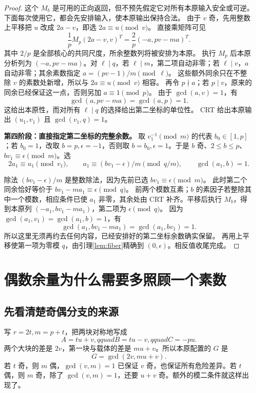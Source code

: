 \documentclass[11pt,a4paper,oneside,openany]{book}
\theoremstyle{definition}
\numberwithin{equation}{chapter}
\begin{document}
\begin{proof}
这个 $M_b$ 是可用的正向返回，但不预先假定它对所有本原输入安全或可逆。
下面每次使用它，都会先安排输入，使本原输出保持合法。
由于 $v$ 奇，先用整数上平移把 $u$ 改成 $2a-v$，即选 $2a\equiv u\pmod v$。
直接乘矩阵可见
\[
\frac1pM_p(2a-v,v)^T=\frac2p(-a,pv-ma)^T.
\]
其中 $2/p$ 是全部核心的共同尺度，所余整数列将被安排为本原。
执行 $M_p$ 后本原分析列为 $(-a,pv-ma)$。对 $\ell\mid q$，若 $\ell\mid m$，第二项自动非零；若 $\ell\mid v$，$a$ 自动非零；其余素数指定 $a=(pv-1)/m\pmod\ell$。
这些额外同余只在不整除 $v$ 的素数处新增，所以与 $2a\equiv u\pmod v$ 相容。
再令 $p\nmid a$；若 $p\mid v$，原来的同余已经保证这一点，否则另加 $a\equiv1\pmod p$。
由于 $\gcd(a,v)=1$，有
\[
\gcd(a,pv-ma)=\gcd(a,p)=1.
\]
这给出本原性，而对所有 $\ell\mid q$ 的选择给出第二坐标的单位性。
CRT 给出本原输出 $(u_1,v_1)$ 且 $\gcd(v_1,q)=1$。

\par\noindent\textbf{第四阶段：直接指定第二坐标的完整余数。}
取 $v_1^{-1}\pmod m$ 的代表 $b_0\in[1,p]$；若 $b_0=1$，改取 $b=p,\epsilon=-1$，否则取 $b=b_0,\epsilon=1$。于是 $b$ 奇、$2\le b\le p$、$bv_1\equiv\epsilon\pmod m$。选
\[
2a_1\equiv u_1\pmod{v_1},\qquad
a_1\equiv(bv_1-\epsilon)/m\pmod{q/m},\qquad \gcd(a_1,b)=1.
\]

除法 $(bv_1-\epsilon)/m$ 是整数除法，因为先前已选 $bv_1\equiv\epsilon\pmod m$。
此时第二个同余恰好等价于 $bv_1-ma_1\equiv\epsilon\pmod q$。
前两个模数互素；$b$ 的素因子若整除其中一个模数，相应条件已使 $a_1$ 非零，其余处由 CRT 补齐。平移后执行 $M_b$，得到本原列 $(-a_1,bv_1-ma_1)$，第二项为 $\epsilon\pmod q$。
因为 $\gcd(a_1,v_1)=\gcd(a_1,b)=1$，有
\[
\gcd(a_1,bv_1-ma_1)=\gcd(a_1,bv_1)=1.
\]
所以这里无须再约去任何内容，已经安排好的第二坐标余数确实保留。
再用上平移使第一项为零模 $q$，由引理\ref{lem:fiber}精确到 $(0,\epsilon)$。相反值收尾完成。
\end{proof}

\chapter{偶数余量为什么需要多照顾一个素数}\label{app:lower}
\section{先看清楚奇偶分支的来源}
写 $r=2t,m=p+t$，把两块对称地写成
\[A=tu+v,qquad B=tu-v,qquad C=-pu.
\]
两个大块的差是 $2v$，第一块与载体的差是 $mu+v$。所以本原配置的 $G$ 是
\[G=\gcd(2v,mu+v).
\]
若 $t$ 奇，则 $m$ 偶，$\gcd(v,m)=1$ 已保证 $v$ 奇，也保证所有危险差异。若 $t$ 偶，则 $m$ 奇，除了 $\gcd(v,m)=1$，还要 $u+v$ 奇。额外的模二条件就这样出现了。
\end{document}
